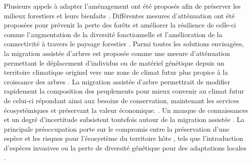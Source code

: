 Plusieurs appels à adapter l'aménagement ont été proposés afin de préserver les milieux forestiers et leurs bienfaits \citep{Nagel2017Adaptivesilviculture,Messier2021sakeresilience}.
Différentes mesures d'atténuation ont été proposées pour prévenir la perte des forêts et améliorer la résilience de celle-ci comme l'augmentation de la diversité fonctionnelle et l'amélioration de la connectivité à travers le paysage forestier \citep{Messier2019functionalcomplex}.
Parmi toutes les solutions envisagées, la migration assistée d'arbres est proposée comme une mesure d'atténuation permettant le déplacement d'individus ou de matériel génétique depuis un territoire climatique originel vers une zone de climat futur plus propice à la croissance des arbres \citep{Vitt2010Assistedmigration,Dumroese2015Considerationsrestoring,Park2018Informationunderload,Park2023Provenancetrials}. 
La migration assistée d'arbre permettrait de modifier rapidement la composition des peuplements pour mieux convenir au climat futur de celui-ci \citep{Pedlar2011implementationassisted} 
répondant ainsi aux besoins de conservation, maintenant les services écosystémiques et préservant la valeur économique. \citep{Ste-Marie2011Assistedmigration,Winder2011Ecologicalimplications}.
Un manque de connaissances et un degré d'incertitude subsistent toutefois autour de la migration assistée \citep{Klenk2015assistedmigration,Park2018Informationunderload}. 
La principale préoccupation porte sur le compromis entre la préservation d'une espèce et les risques pour l'écosystème du territoire hôte \citep{Ricciardi2009Assistedcolonization}, 
tels que l'introduction d'espèces invasives ou la perte de diversité génétique pour des adaptations locales \citep{McLachlan2007frameworkdebate,Vitt2010Assistedmigration,Hewitt2011Takingstock,VanDaele2022Genomicanalyses}.

